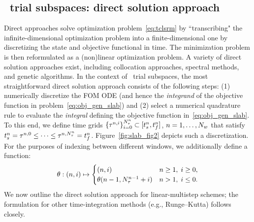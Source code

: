 \subsection{\spatialAcronym\ trial subspaces: direct solution approach}\label{sec:direct} 

Direct approaches solve optimization problem~\eqref{eq:tclsrm} by
``transcribing" the infinite-dimensional optimization problem into a finite-dimensional one by discretizing the state and objective functional in time.
The minimization problem is then reformulated as a (non)linear 
optimization problem. A variety of direct solution approaches exist, 
including collocation approaches, spectral  methods, and genetic algorithms.  
In the context of \spatialAcronym\ trial subspaces, the most straightforward direct solution approach consists of the 
following steps: (1) numerically discretize the FOM ODE (and hence the
\textit{integrand} of the objective function in problem~\eqref{eq:obj_gen_slab}) and 
(2) select a numerical quadrature rule to evaluate the \textit{integral}
defining the objective function in~\eqref{eq:obj_gen_slab}.
To this end, we define time grids
$\{\tau^{n,i}\}_{i=0}^{N_{\tau}^{n}}\subset[t_s^{n},t_f^{n}]$,
$n=1,\ldots,N_w$ that
satisfy 
$t_s^{n}=\tau^{n,0} \le \cdots \le \tau^{n,N_{\tau}^{n}} 
 = t_f^{n}$. %
Figure~\ref{fig:slab_fig2} depicts such a discretization.
For the purposes of indexing between different windows, we additionally define a function:
$$\theta: (n,i) \mapsto 
\begin{cases}
	(n,i) & n \geq 1, \; i \geq 0, \\
\theta(n-1,N_{\tau}^{n-1}+i) & n > 1, \; i \le 0.
\end{cases}$$
We now outline the direct solution approach for linear-multistep schemes; the formulation for
other time-integration methods (e.g., Runge--Kutta) follows closely. 
